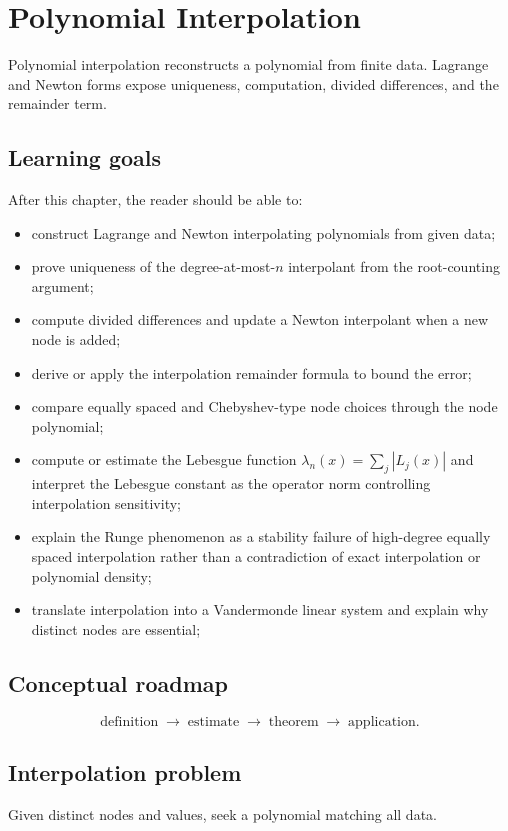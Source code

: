 \chapter{Polynomial Interpolation}
\label{ch:ii20}

Polynomial interpolation reconstructs a polynomial from finite data. Lagrange and Newton forms expose uniqueness, computation, divided differences, and the remainder term.

\section*{Learning goals}
After this chapter, the reader should be able to:
\begin{itemize}
\item construct Lagrange and Newton interpolating polynomials from given data;
\item prove uniqueness of the degree-at-most-\(n\) interpolant from the root-counting argument;
\item compute divided differences and update a Newton interpolant when a new node is added;
\item derive or apply the interpolation remainder formula to bound the error;
\item compare equally spaced and Chebyshev-type node choices through the node polynomial;
\item compute or estimate the Lebesgue function $\lambda_n(x)=\sum_j|L_j(x)|$ and interpret the Lebesgue constant as the operator norm controlling interpolation sensitivity;
\item explain the Runge phenomenon as a stability failure of high-degree equally spaced interpolation rather than a contradiction of exact interpolation or polynomial density;
\item translate interpolation into a Vandermonde linear system and explain why distinct nodes are essential;
\end{itemize}
\section*{Conceptual roadmap}
\[
\boxed{\text{definition}\;\longrightarrow\;\text{estimate}\;\longrightarrow\;\text{theorem}\;\longrightarrow\;\text{application}.}
\]

\section{Interpolation problem}
Given distinct nodes and values, seek a polynomial matching all data.

